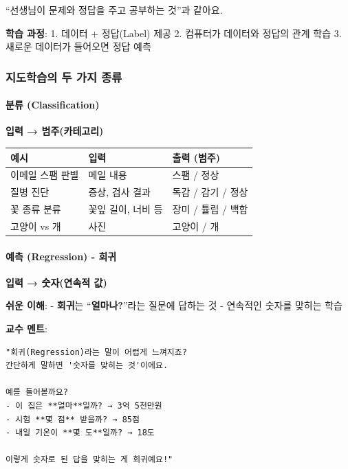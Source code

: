 \documentclass[a4paper, 11pt]{article}
\begin{document}
``선생님이 문제와 정답을 주고 공부하는 것''과 같아요.

\textbf{학습 과정}: 1. 데이터 + 정답(Label) 제공 2. 컴퓨터가 데이터와
정답의 관계 학습 3. 새로운 데이터가 들어오면 정답 예측

\hypertarget{uxc9c0uxb3c4uxd559uxc2b5uxc758-uxb450-uxac00uxc9c0-uxc885uxb958}{%
\subsubsection{지도학습의 두 가지
종류}\label{uxc9c0uxb3c4uxd559uxc2b5uxc758-uxb450-uxac00uxc9c0-uxc885uxb958}}

\hypertarget{uxbd84uxb958-classification}{%
\paragraph{ 분류 (Classification)}\label{uxbd84uxb958-classification}}

\textbf{입력 → 범주(카테고리)}

\begin{longtable}{p{3cm}p{4cm}p{7cm}}
\toprule\noalign{}
예시 & 입력 & 출력 (범주) \\
\midrule\noalign{}
\endhead
\bottomrule\noalign{}
\endlastfoot
이메일 스팸 판별 & 메일 내용 & 스팸 / 정상 \\
질병 진단 & 증상, 검사 결과 & 독감 / 감기 / 정상 \\
꽃 종류 분류 & 꽃잎 길이, 너비 등 & 장미 / 튤립 / 백합 \\
고양이 vs 개 & 사진 & 고양이 / 개 \\
\end{longtable}

\hypertarget{uxc608uxce21-regression---uxd68cuxadc0}{%
\paragraph{ 예측 (Regression) -
회귀}\label{uxc608uxce21-regression---uxd68cuxadc0}}

\textbf{입력 → 숫자(연속적 값)}

 \textbf{쉬운 이해}: - \textbf{회귀}는 ``\textbf{얼마나?}''라는 질문에
답하는 것 - 연속적인 숫자를 맞히는 학습

\textbf{교수 멘트}:

\begin{verbatim}
"회귀(Regression)라는 말이 어렵게 느껴지죠?
간단하게 말하면 '숫자를 맞히는 것'이에요.

예를 들어볼까요?
- 이 집은 **얼마**일까? → 3억 5천만원
- 시험 **몇 점** 받을까? → 85점
- 내일 기온이 **몇 도**일까? → 18도

이렇게 숫자로 된 답을 맞히는 게 회귀예요!"
\end{verbatim}
\end{document}
